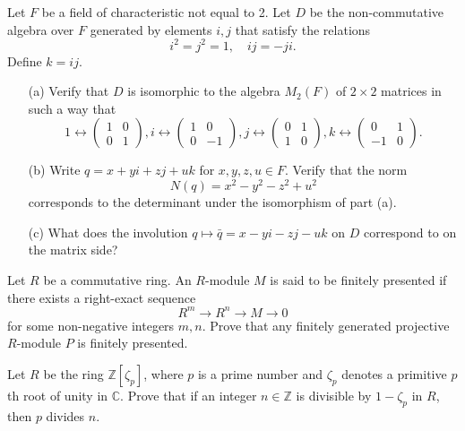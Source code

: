 \documentclass[openany]{book}
\begin{document}
\begin{prob}
    Let \(F\) be a field of characteristic not equal to 2. Let \(D\) be the non-commutative algebra over \(F\) generated by elements \(i,j\) that satisfy the relations
    \[i^2 = j^2 = 1, \quad ij = -ji.\]
    Define \(k = ij.\)
    \begin{itemize}
        \item[(a)] Verify that \(D\) is isomorphic to the algebra \(M_2(F)\) of \(2 \times 2\) matrices in such a way that
        \[1 \leftrightarrow \begin{pmatrix} 1 & 0 \\ 0 & 1 \end{pmatrix}, i \leftrightarrow \begin{pmatrix} 1 & 0 \\ 0 & -1 \end{pmatrix}, j \leftrightarrow \begin{pmatrix} 0 & 1 \\ 1 & 0 \end{pmatrix}, k \leftrightarrow \begin{pmatrix} 0 & 1 \\ -1 & 0 \end{pmatrix}.\]
        \item[(b)] Write \(q = x + yi + zj + uk\) for \(x,y,z,u \in F\). Verify that the norm
        \[N(q) = x^2 - y^2 - z^2 + u^2\]
        corresponds to the determinant under the isomorphism of part (a).
        \item[(c)] What does the involution \(q \mapsto \bar{q} = x - yi - zj - uk\) on \(D\) correspond to on the matrix side?
    \end{itemize}
\end{prob}




\begin{prob}
    Let \(R\) be a commutative ring. An \(R\)-module \(M\) is said to be finitely presented if there exists a right-exact sequence
    \[R^m \longrightarrow R^n \longrightarrow M \longrightarrow 0\]
    for some non-negative integers \(m,n\). Prove that any finitely generated projective \(R\)-module \(P\) is finitely presented.
\end{prob}





\begin{prob}
    Let \(R\) be the ring \(\mathbb{Z}[\zeta_p]\), where \(p\) is a prime number and \(\zeta_p\) denotes a primitive \(p\)th root of unity in \(\mathbb{C}\). Prove that if an integer \(n \in \mathbb{Z}\) is divisible by \(1 - \zeta_p\) in \(R\), then \(p\) divides \(n\).
\end{prob}
\end{document}
